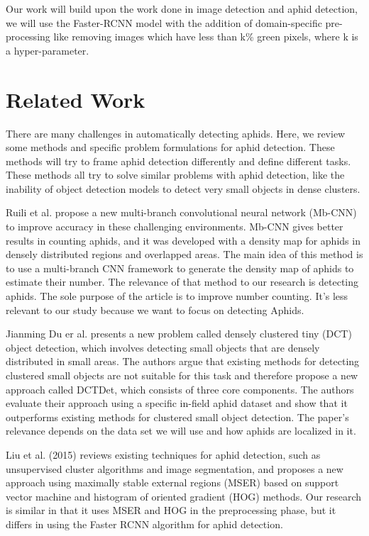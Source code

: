 \documentclass{article}
\begin{document}
Our work will build upon the work done in image detection and aphid detection, 
we will use the Faster-RCNN model with the addition of domain-specific pre-processing 
like removing images which have less than k\% green pixels, where k is a hyper-parameter.

\section{Related Work}
There are many challenges in automatically detecting aphids. 
Here, we review some methods and specific problem formulations for aphid detection. 
These methods will try to frame aphid detection differently and define different tasks. 
These methods all try to solve similar problems with aphid detection, 
like the inability of object detection models to detect very small objects in dense clusters.


Ruili et al. propose a new multi-branch convolutional neural network (Mb-CNN) 
to improve accuracy in these challenging environments. Mb-CNN gives better results in counting aphids, 
and it was developed with a density map for aphids in densely distributed regions and overlapped areas. 
The main idea of this method is to use a multi-branch CNN framework to generate the density map of 
aphids to estimate their number. The relevance of that method to our research is detecting aphids. 
The sole purpose of the article is to improve number counting. 
It's less relevant to our study because we want to focus on detecting Aphids.


Jianming Du er al. \cite{DenseTinyPest} presents a new problem called densely clustered tiny (DCT) object detection, 
which involves detecting small objects that are densely distributed in small areas. 
The authors argue that existing methods for detecting clustered small objects are not suitable 
for this task and therefore propose a new approach called DCTDet, 
which consists of three core components. The authors evaluate their approach using a specific 
in-field aphid dataset and show that it outperforms existing methods for clustered small 
object detection. The paper's relevance depends on the data set we will use and how aphids are 
localized in it.


Liu et al. (2015) \cite{DetectionInWeatFields} reviews existing techniques for aphid detection, 
such as unsupervised cluster algorithms and image segmentation, 
and proposes a new approach using maximally stable external regions (MSER) based on support 
vector machine and histogram of oriented gradient (HOG) methods. 
Our research is similar in that it uses MSER and HOG in the preprocessing phase, 
but it differs in using the Faster RCNN algorithm for aphid detection.
\end{document}
